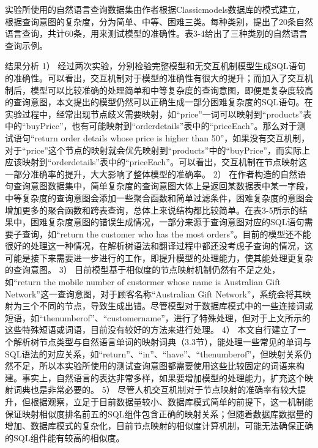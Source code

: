 实验所使用的自然语言查询数据集由作者根据Classicmodels数据库的模式建立，根据查询意图的复杂度，分为简单、中等、困难三类。每种类别，提出了20条自然语言查询，共计60条，用来测试模型的准确性。表3-4给出了三种类别的自然语言查询示例。

结果分析
1）	经过两次实验，分别检验完整模型和无交互机制模型生成SQL语句的准确性。可以看出，交互机制对于模型的准确性有很大的提升；而加入了交互机制后，模型可以比较准确的处理简单和中等复杂度的查询意图，即便是复杂度较高的查询意图，本文提出的模型仍然可以正确生成一部分困难复杂度的SQL语句。在实验过程中，经常出现节点歧义需要映射，如“price”一词可以映射到“products”表中的“buyPrice”，也有可能映射到“orderdetails”表中的“priceEach”。那么对于测试语句“return order details whose price is higher than 50”，如果没有交互机制，对于“price”这个节点的映射就会优先映射到“products”中的“buyPrice”，而实际上应该映射到“orderdetails”表中的“priceEach”。可以看出，交互机制在节点映射这一部分准确率的提升，大大影响了整体模型的准确率。
2）	在作者构造的自然语句查询意图数据集中，简单复杂度的查询意图大体上是返回某数据表中某一字段，中等复杂度的查询意图会添加一些聚合函数和简单过滤条件，困难复杂度的意图会增加更多的聚合函数和跨表查询，总体上来说结构都比较简单。在表3-5所示的结果中，困难复杂度意图的错误生成情况，一部分来源于查询意图对应的SQL语句需要子查询，如“return the customer who has the most orders”。目前的模型还不能很好的处理这一种情况，在解析树语法和翻译过程中都还没考虑子查询的情况，这可能是接下来需要进一步进行的工作，即提升模型的处理能力，使其能处理更复杂的查询意图。
3）	目前模型基于相似度的节点映射机制仍然有不足之处，如“return the mobile number of custormer whose name is Australian Gift Network”这一查询意图，对于顾客名称“Australian Gift Network”，系统会将其映射为三个不同的节点，导致生成出错。尽管模型对于数据库模式中的一些连接词或短语，如“thenumberof”、“customername”，进行了特殊处理，但对于上文所示的这些特殊短语或词语，目前没有较好的方法来进行处理。
4）	本文自行建立了一个解析树节点类型与自然语言单词的映射词典（3.3节），能处理一些常见的单词与SQL语法的对应关系，如“return”、“in”、“have”、“thenumberof”，但映射关系仍然不足，所以本实验所使用的测试查询意图都需要使用这些比较固定的词语来构建。事实上，自然语言的表达非常多样，如果要增加模型的处理能力，扩充这个映射词典也是非常必要的。
5）	尽管人机交互机制对于节点映射的准确率有较大提升，但根据观察，立足于目前数据量较小、数据库模式简单的前提下，这一机制能保证映射相似度排名前五的SQL组件包含正确的映射关系；但随着数据库数据量的增加、数据库模式的复杂化，目前节点映射的相似度计算机制，可能无法确保正确的SQL组件能有较高的相似度。



